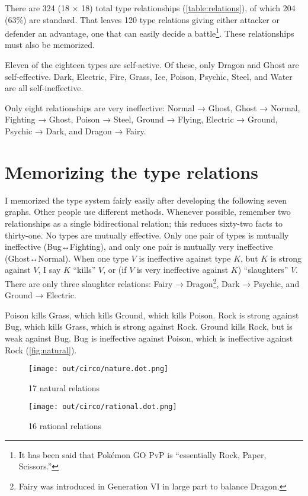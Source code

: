 There are 324 (18 × 18) total type relationships (\autoref{table:relations}),
  of which 204 (63\%) are standard.
That leaves 120 type relations giving either attacker or defender an advantage,
  one that can easily decide a battle\footnote{It has been said that Pokémon GO PvP is ``essentially Rock, Paper, Scissors.''}.
These relationships must also be memorized.



Eleven of the eighteen types are self-active.
Of these, only Dragon and Ghost are self-effective.
Dark, Electric, Fire, Grass, Ice, Poison, Psychic, Steel, and Water are all self-ineffective.%

Only eight relationships are very ineffective:
Normal → Ghost,
Ghost → Normal,
Fighting → Ghost,
Poison → Steel,
Ground → Flying,
Electric → Ground,
Psychic → Dark,
and Dragon → Fairy.

\section{Memorizing the type relations}
I memorized the type system fairly easily after developing the following seven graphs.
Other people use different methods.
Whenever possible, remember two relationships as a single bidirectional relation;
  this reduces sixty-two facts to thirty-one.
No types are mutually effective.
Only one pair of types is mutually ineffective (Bug↔Fighting),
  and only one pair is mutually very ineffective (Ghost↔Normal).
When one type $V$ is ineffective against type $K$, but $K$ is strong
 against $V$, I say $K$ ``kills'' $V$, or
 (if $V$ is very ineffective against $K$) ``slaughters'' $V$.
There are only three slaughter relations: Fairy → Dragon\footnote{Fairy was
  introduced in Generation VI in large part to balance Dragon.}, Dark → Psychic,
  and Ground → Electric.
\clearpage

\noindent{}Poison kills Grass, which kills Ground, which kills Poison.
Rock is strong against Bug, which kills Grass, which is strong against Rock.
Ground kills Rock, but is weak against Bug.
Bug is ineffective against Poison, which is ineffective against Rock (\autoref{fig:natural}).
\begin{figure}[h!]
\begin{minipage}[t]{0.5\textwidth}
\centering
\texttt{[image: out/circo/nature.dot.png]}
\caption{17 natural relations\label{fig:natural}}
\end{minipage}
\begin{minipage}[t]{0.5\textwidth}
\centering
\texttt{[image: out/circo/rational.dot.png]}
\caption{16 rational relations\label{fig:rational}}
\end{minipage}
\end{figure}

